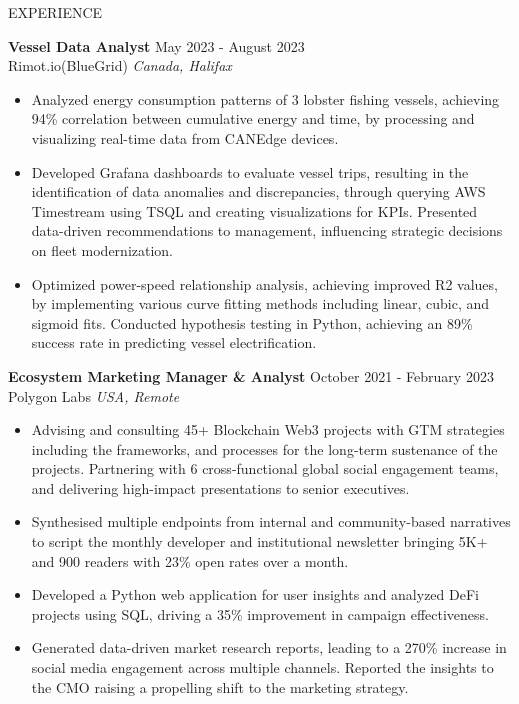 \documentclass{resume} %
\begin{document}
\begin{rSection}{EXPERIENCE}

\textbf{Vessel Data Analyst} \hfill May 2023 - August 2023\\
Rimot.io(BlueGrid) \hfill \textit{Canada, Halifax}
 \begin{itemize}
    \itemsep -3pt {} 
    \item Analyzed energy consumption patterns of 3 lobster fishing vessels, achieving 94\% correlation between cumulative energy and time, by processing and visualizing real-time data from CANEdge devices.
    \item Developed Grafana dashboards to evaluate vessel trips, resulting in the identification of data anomalies and discrepancies, through querying AWS Timestream using TSQL and creating visualizations for KPIs. Presented data-driven recommendations to management, influencing strategic decisions on fleet modernization.
    \item Optimized power-speed relationship analysis, achieving improved R2 values, by implementing various curve fitting methods including linear, cubic, and sigmoid fits. Conducted hypothesis testing in Python, achieving an 89\% success rate in predicting vessel electrification.
 \end{itemize}


\textbf{Ecosystem Marketing Manager \& Analyst} \hfill October 2021 - February 2023\\
Polygon Labs \hfill \textit{USA, Remote}
 \begin{itemize}
    \itemsep -3pt {} 
    \item Advising and consulting 45+ Blockchain Web3 projects with GTM strategies including the frameworks, and processes for the long-term sustenance of the projects. Partnering with 6 cross-functional global social engagement teams, and delivering high-impact presentations to senior executives.
    \item Synthesised multiple endpoints from internal and community-based narratives to script the monthly developer and institutional newsletter bringing 5K+ and 900 readers with 23\% open rates over a month.
    \item Developed a Python web application for user insights and analyzed DeFi projects using SQL, driving a 35\% improvement in campaign effectiveness.
    \item Generated data-driven market research reports, leading to a 270\% increase in social media engagement across multiple channels. Reported the insights to the CMO raising a propelling shift to the marketing strategy.

 \end{itemize}

\end{rSection} 
\end{document}
